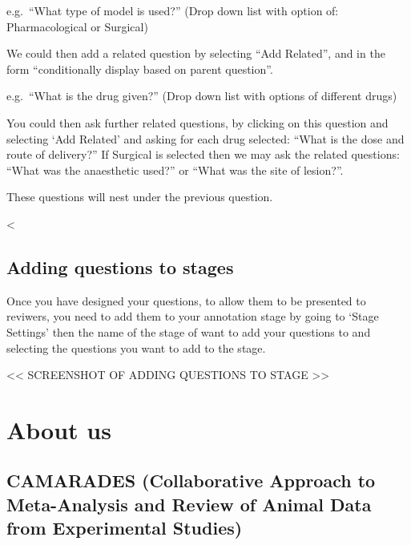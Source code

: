 \documentclass[
]{book}
\begin{document}
e.g.~``What type of model is used?''
(Drop down list with option of: Pharmacological or Surgical)

We could then add a related question by selecting ``Add Related'', and in the form ``conditionally display based on parent question''.

e.g.~``What is the drug given?''
(Drop down list with options of different drugs)

You could then ask further related questions, by clicking on this question and selecting `Add Related' and asking for each drug selected: ``What is the dose and route of delivery?'' If Surgical is selected then we may ask the related questions: ``What was the anaesthetic used?'' or ``What was the site of lesion?''.

These questions will nest under the previous question.

\textless{}

\begin{quote}
\end{quote}

\hypertarget{adding-questions-to-stages}{%
\section{Adding questions to stages}\label{adding-questions-to-stages}}

Once you have designed your questions, to allow them to be presented to reviwers, you need to add them to your annotation stage by going to `Stage Settings' then the name of the stage of want to add your questions to and selecting the questions you want to add to the stage.

\textless{}\textless{} SCREENSHOT OF ADDING QUESTIONS TO STAGE \textgreater{}\textgreater{}

\hypertarget{about}{%
\chapter{About us}\label{about}}

\hypertarget{camarades-collaborative-approach-to-meta-analysis-and-review-of-animal-data-from-experimental-studies}{%
\section{CAMARADES (Collaborative Approach to Meta-Analysis and Review of Animal Data from Experimental Studies)}\label{camarades-collaborative-approach-to-meta-analysis-and-review-of-animal-data-from-experimental-studies}}
\end{document}
